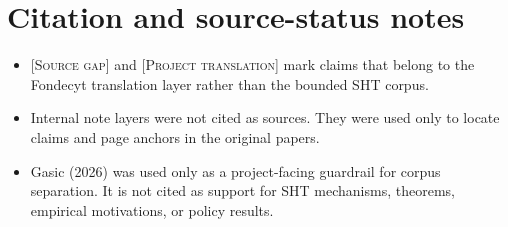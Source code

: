 \documentclass[11pt]{article}
\newcommand{\projecttranslation}{\textsc{[Project translation]}}
\newcommand{\sourcegap}{\textsc{[Source gap]}}
\begin{document}
\section*{Citation and source-status notes}

\begin{itemize}
  \item \sourcegap{} and \projecttranslation{} mark claims that belong to the Fondecyt translation layer rather than the bounded SHT corpus.
  \item Internal note layers were not cited as sources. They were used only to locate claims and page anchors in the original papers.
  \item Gasic (2026) was used only as a project-facing guardrail for corpus separation. It is not cited as support for SHT mechanisms, theorems, empirical motivations, or policy results.
\end{itemize}

\pagebreak


\end{document}

